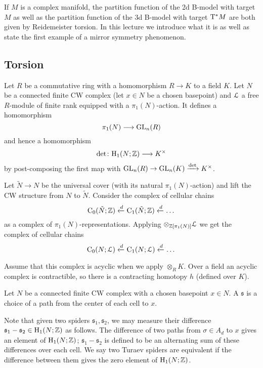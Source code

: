 
\newcommand{\id}{\mathrm{id}}
\newcommand{\bH}{\mathbf{H}}
\newcommand{\fs}{\mathfrak{s}}
If $M$ is a complex manifold, the partition function of the 2d B-model with target $M$ as well as the partition function of the 3d B-model with target $\mathrm{T}^* M$ are both given by Reidemeister torsion. In this lecture we introduce what it is as well as state the first example of a mirror symmetry phenomenon.

\subsection{Torsion}

Let $R$ be a commutative ring with a homomorphism $R\rightarrow K$ to a field $K$. Let $N$ be a connected finite CW complex (let $x\in N$ be a chosen basepoint) and $\mathcal{L}$ a free $R$-module of finite rank equipped with a $\pi_1(N)$-action. It defines a homomorphism
\[\pi_1(N)\longrightarrow \mathrm{GL}_n(R)\]
and hence a homomorphism
\[\det\colon \mathrm{H}_1(N;\mathbb{Z})\longrightarrow K^\times\]
by post-composing the first map with $\mathrm{GL}_n(R)\rightarrow \mathrm{GL}_n(K)\xrightarrow{\det} K^\times$.

Let $\tilde{N}\rightarrow N$ be the universal cover (with its natural $\pi_1(N)$-action) and lift the CW structure from $N$ to $\tilde{N}$. Consider the complex of cellular chains
\[\mathrm{C}_0(\tilde{N}; \mathbb{Z})\xleftarrow{d} \mathrm{C}_1(\tilde{N}; \mathbb{Z})\xleftarrow{d} \dots\]
as a complex of $\pi_1(N)$-representations. Applying $\otimes_{\mathbb{Z}[\pi_1(N)]}\mathcal{L}$ we get the complex of cellular chains
\[\mathrm{C}_0(N; \mathcal{L})\xleftarrow{d} \mathrm{C}_1(N; \mathcal{L})\xleftarrow{d} \dots\]

Assume that this complex is acyclic when we apply $\otimes_R K$. Over a field an acyclic complex is contractible, so there is a contracting homotopy $h$ (defined over $K$).

\begin{defn}
	Let $N$ be a connected finite CW complex with a chosen basepoint $x\in N$. A  $\fs$ is a choice of a path from the center of each cell to $x$.
\end{defn}

Note that given two spiders $\fs_1,\fs_2$, we may measure their difference $\fs_1-\fs_2\in\rH_1(N;\Z)$ as follows. The difference of two paths from $\sigma\in A_d$ to $x$ gives an element of $\mathrm{H}_1(N; \mathbb{Z})$; $\fs_1-\fs_2$ is defined to be an alternating sum of these differences over each cell. We say two Turaev spiders are equivalent if the difference between them gives the zero element of $\mathrm{H}_1(N; \mathbb{Z})$.

